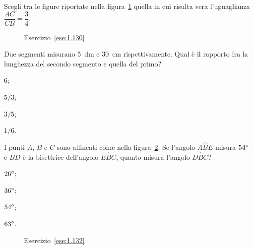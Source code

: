 	
\begin{esercizio}
\label{ese:1.130}
Scegli tra le figure riportate nella figura~\ref{fig:ese1.130} quella in cui risulta vera l'uguaglianza $\dfrac{AC}{CB}=\dfrac{3}{4}$.
\end{esercizio}

\begin{figure}[htb]
 \centering
 \caption{Esercizio~\ref{ese:1.130}}\label{fig:ese1.130}
\end{figure}

\begin{esercizio}
\label{ese:1.131}
Due segmenti misurano 5~dm e 30~cm rispettivamente. Qual è il rapporto fra la lunghezza del secondo segmento e quella del primo?
\begin{multicols}{4}
\begin{enumeratea}
\item 6;
\item $5/3$;
\item $3/5$;
\item $1/6$.
\end{enumeratea}
\end{multicols}
\end{esercizio}

\begin{esercizio}
\label{ese:1.132}
I punti $A$, $B$ e $C$ sono allineati come nella figura~\ref{fig:ese1.132}. Se l'angolo $A\widehat{B}E$ misura $54{}^{\circ}$ e $BD$ è la bisettrice dell'angolo $E\widehat{B}C$, quanto misura l'angolo $D\widehat{B}C$?
\begin{multicols}{4}
\begin{enumeratea}
\item $26{}^{\circ}$;
\item $36{}^{\circ}$;
\item $54{}^{\circ}$;
\item $63{}^{\circ}$.
\end{enumeratea}
\end{multicols}
\end{esercizio}

\begin{figure}[htb]
 \centering
 \caption{Esercizio~\ref{ese:1.132}}\label{fig:ese1.132}
\end{figure}


